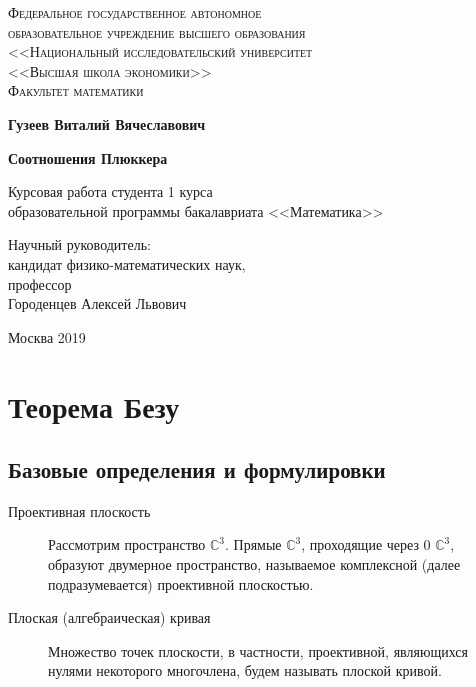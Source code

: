 \documentclass[a4paper, 12pt]{article}
\begin{document}
\begin{center}
{\scshape Федеральное государственное автономное\\
образовательное учреждение высшего образования\\
<<Национальный исследовательский университет\\
<<Высшая школа экономики>>\\[1ex]
Факультет математики\par}

\par\vfill

\textbf{\large Гузеев Виталий Вячеславович}

\vspace{1.5cm}

{\Large\bfseries
Соотношения Плюккера
\par}

\vspace{1.5cm}

Курсовая работа студента 1 курса\\[1ex]
образовательной программы бакалавриата <<Математика>>
\par\vfill
\noindent\hspace{0.52\textwidth}\parbox[t]{0.48\textwidth}{%
Научный руководитель:\\[3pt]
кандидат физико-математических наук,\\
профессор\\
Городенцев Алексей Львович\\[2ex]
}%
\par\vfill
Москва 2019
\end{center}
\thispagestyle{empty}
\pagebreak
\section{Теорема Безу}
\subsection{Базовые определения и формулировки}
\begin{description}
\item[Проективная плоскость]
Рассмотрим пространство $\mathbb{C}^3$. Прямые $\mathbb{C}^3$, проходящие через 0 $\mathbb{C}^3$, образуют двумерное пространство, называемое комплексной (далее подразумевается) проективной плоскостью.
\item[Плоская (алгебраическая) кривая]
Множество точек плоскости, в частности, проективной, являющихся нулями некоторого многочлена, будем называть плоской кривой.
\end{description}
\end{document}
